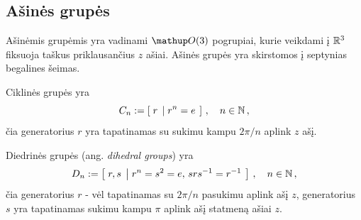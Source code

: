 
\subsection{Ašinės grupės}

Ašinėmis grupėmis yra vadinami $\Orth3$ pogrupiai,
kurie veikdami į $\mathbb{R}^3$ fiksuoja taškus priklausančius $z$ ašiai.
Ašinės grupės yra skirstomos į septynias begalines šeimas.

\begin{definition}
	Ciklinės grupės yra
	\begin{equation}
		C_n := \left[\; r \;\left|\; r^n=e \;\right.\right]
		\,,\quad
		n \in \mathbb{N}
		\,,
	\end{equation}
	čia generatorius $r$ yra tapatinamas 
	su sukimu kampu $2\pi/n$ aplink $z$ ašį.
\end{definition}

\begin{definition}
	Diedrinės grupės (ang. \emph{dihedral groups}) yra
	\begin{equation}
		D_n := \left[\; r,s \;\left|\; r^n=s^2=e,\, srs^{-1}=r^{-1} \;\right.\right]
		\,,\quad
		n \in \mathbb{N}
		\,,
	\end{equation}
	čia generatorius $r$ - vėl tapatinamas su $2\pi/n$ pasukimu aplink ašį $z$,
	generatorius $s$ yra tapatinamas sukimu kampu $\pi$ aplink ašį statmeną ašiai $z$.
\end{definition}

